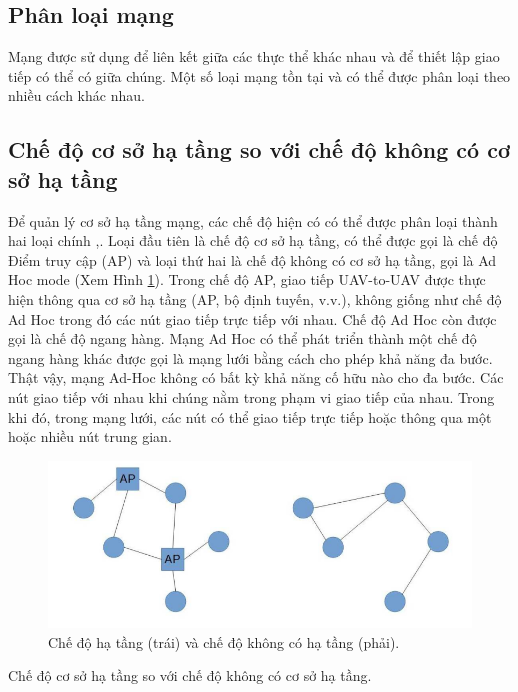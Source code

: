 \documentclass[11pt,openany]{book}
\begin{document}
\begin{algorimth}[H]
\section{Phân loại mạng}
Mạng được sử dụng để liên kết giữa các thực thể khác nhau và để thiết lập giao tiếp có thể có giữa chúng. Một số loại mạng tồn tại và có thể được phân loại theo nhiều cách khác nhau.
\subsection{Chế độ cơ sở hạ tầng so với chế độ không có cơ sở hạ tầng}
Để quản lý cơ sở hạ tầng mạng, các chế độ hiện có có thể được phân loại thành hai loại chính \cite{bekmezci2013flying},\cite{hayat2015experimental}. Loại đầu tiên là chế độ cơ sở hạ tầng, có thể được gọi là chế độ Điểm truy cập (AP) và loại thứ hai là chế độ không có cơ sở hạ tầng, gọi là Ad Hoc mode (Xem Hình \ref{fig:4.1}). Trong chế độ AP, giao tiếp UAV-to-UAV được thực hiện thông qua cơ sở hạ tầng (AP, bộ định tuyến, v.v.), không giống như chế độ Ad Hoc trong đó các nút giao tiếp trực tiếp với nhau. Chế độ Ad Hoc còn được gọi là chế độ ngang hàng. Mạng Ad Hoc có thể phát triển thành một chế độ ngang hàng khác được gọi là mạng lưới bằng cách cho phép khả năng đa bước. Thật vậy, mạng Ad-Hoc không có bất kỳ khả năng cố hữu nào cho đa bước. Các nút giao tiếp với nhau khi chúng nằm trong phạm vi giao tiếp của nhau. Trong khi đó, trong mạng lưới, các nút có thể giao tiếp trực tiếp hoặc thông qua một hoặc nhiều nút trung gian.
\begin{figure}[H]
    \centering
    \includegraphics[scale=0.4]{assets/4_1.png}
    \caption{Chế độ hạ tầng (trái) và chế độ không có hạ tầng (phải).}
    \label{fig:4.1}
\end{figure}
\begin{table}[H]
    \centering
    \caption{Chế độ cơ sở hạ tầng so với chế độ không có cơ sở hạ tầng.}

\end{table}
\end{algorimth}
\end{document}
